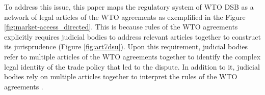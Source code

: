 To address this issue, 
this paper maps 
the regulatory system of WTO DSB 
as a network of legal articles 
of the WTO agreements as exemplified in the Figure \ref{fig:market-aceess_directed}. 
This is because rules of the WTO agreements
explicitly requires judicial bodies to address 
relevant articles together to construct its jurisprudence (Figure \ref{fig:art7dsu}).
Upon this requirement, judicial bodies refer to 
multiple articles of the WTO agreements together
to identify the complex legal identity of the trade policy that led to the dispute.
In addition to it, judicial bodies rely on multiple articles together to interpret the rules of the WTO agreements
\citep{oesch2003standards}.





